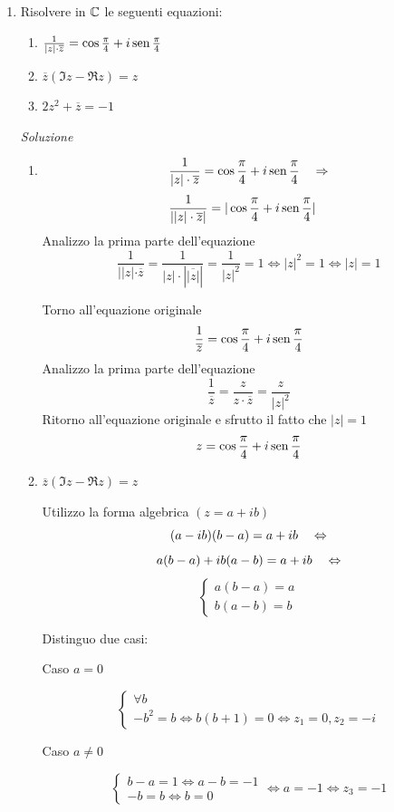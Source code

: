 \documentclass{article}
\begin{document}
\begin{enumerate}[label=\textbf{Esercizio 3.\arabic*.},itemindent=*]
    \item Risolvere in $\mathbb{C}$ le seguenti equazioni: 
        \begin{enumerate}
            \item $\frac{1}{|z|\cdot \overline{z}}=\cos\frac{\pi}{4}+i\text{\textnormal{\,sen\,}} \frac{\pi}{4}$
            \item $\overline{z}(\Im z-\Re z)=z$
            \item $2z^2+\overline{z}=-1$
        \end{enumerate}

    \item[\textit{\large Soluzione~}]~
        \begin{enumerate}
        
        
        \item
        \[\frac{1}{|z|\cdot \overline{z}}=\cos\frac{\pi}{4}+i\text{\textnormal{\,sen\,}} \frac{\pi}{4}~~~\Rightarrow\]
        \[\frac{1}{||z|\cdot\overline{z}|}=|\cos\frac{\pi}{4}+i\text{\textnormal{\,sen\,}}\frac{\pi}{4}|~~~\]
        Analizzo la prima parte dell'equazione
        \[\frac{1}{||z|\cdot\overline{z}}=\frac{1}{|z|\cdot|\overline{|z|}|}=\frac{1}{|z|^2}=1\Leftrightarrow|z|^2=1\Leftrightarrow |z|=1\]

        Torno all'equazione originale
        \[\frac{1}{\overline{z}}=\cos\frac{\pi}{4}+i\text{\textnormal{\,sen\,}} \frac{\pi}{4}\]
        Analizzo la prima parte dell'equazione
        \[\frac{1}{\overline{z}}=\frac{z}{z\cdot\overline{z}}=\frac{z}{|z|^2}\]
        Ritorno all'equazione originale e sfrutto il fatto che $|z|=1$
        \[z=\cos\frac{\pi}{4}+i\text{\textnormal{\,sen\,}} \frac{\pi}{4}\]
    

        \item $\overline{z}(\Im z-\Re z)=z$
        \par Utilizzo la forma algebrica $(z=a+ib)$
        \[(a-ib)(b-a)=a+ib~~~\Leftrightarrow\]\[a(b-a)+ib(a-b)=a+ib~~~\Leftrightarrow\]
        \[\begin{cases}
        a(b-a)=a \\ b(a-b)=b
        \end{cases} \]
        \par
        Distinguo due casi: \par
        Caso $a=0$
        \par
        \[\begin{cases}
        \forall b \\ -b^2=b\Leftrightarrow b(b+1)=0\Leftrightarrow z_1=0,z_2=-i
        \end{cases}\] 
        \par Caso $a\neq 0$
        \par
        \[\begin{cases}
        b-a=1\Leftrightarrow a-b=-1 \\ -b=b\Leftrightarrow b=0
        \end{cases} \Leftrightarrow a=-1\Leftrightarrow z_3=-1\]
        


\end{enumerate}
\end{enumerate}
\end{document}
